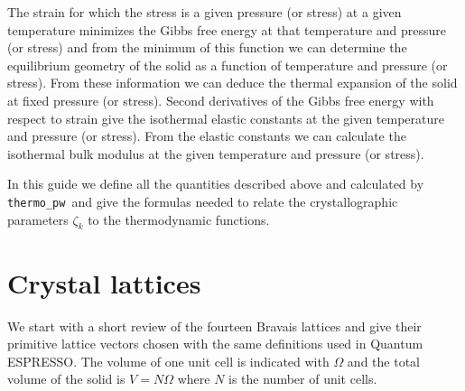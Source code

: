 \documentclass[12pt,a4paper]{article}
\def\qe{{\sc Quantum ESPRESSO}}
\def\tpw{\texttt{thermo\_pw}}
\begin{document}
The strain for which the stress is a given pressure (or stress) at a given
temperature minimizes the Gibbs free energy at that temperature and
pressure (or stress) and from the minimum of this function we can determine 
the equilibrium geometry of the solid as a function of temperature and 
pressure (or stress). 
From these information we can deduce the thermal expansion of the 
solid at fixed pressure (or stress). Second derivatives of the Gibbs free
energy with respect to strain give the isothermal elastic constants at the 
given temperature and pressure (or stress). From the elastic constants 
we can calculate the isothermal bulk modulus at the
given temperature and pressure (or stress).

In this guide we define all the quantities described above and calculated 
by \tpw\ and give the formulas needed to relate the crystallographic
parameters $\zeta_k$ to the thermodynamic functions.

\newpage

\section{\color{coral}Crystal lattices}
We start with a short review of the fourteen Bravais lattices and 
give their primitive lattice vectors chosen with the same definitions used
in \qe. 
The volume of one unit cell is indicated with $\Omega$ and the total 
volume of the solid is $V=N\Omega$ where $N$ is the number of unit cells.
\end{document}
